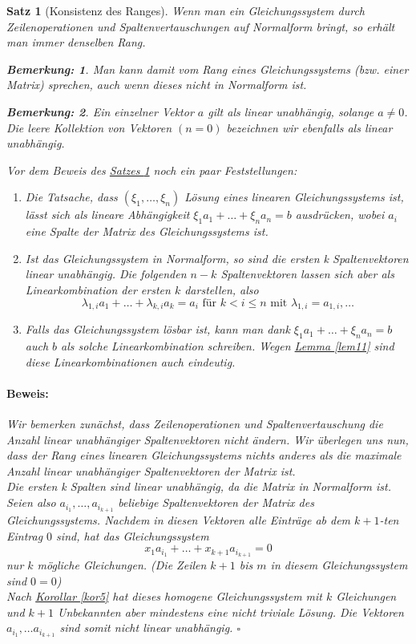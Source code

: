 \documentclass{report}
\newcommand{\lb}{\lambda}
\theoremstyle{customrem}
\newtheorem*{bem}{Bemerkung:}
\theoremstyle{customdef}
\newtheorem{satz}[definition]{Satz}
\renewenvironment{proof}{\vspace{-.75cm}\paragraph{Beweis: }}{\vspace{-.5cm}\hfill$\square$}
\begin{document}
	\begin{satz}[Konsistenz des Ranges]
		\label{satz12}
		Wenn man ein Gleichungssystem durch Zeilenoperationen und Spaltenvertauschungen auf Normalform bringt, so erhält man immer denselben Rang.		
		\begin{bem}
			Man kann damit vom Rang eines Gleichungssystems (bzw. einer Matrix) sprechen, auch wenn dieses nicht in Normalform ist.
		\end{bem}
		\begin{bem}
			Ein einzelner Vektor $a$ gilt als linear unabhängig, solange $a \neq 0$. Die leere Kollektion von Vektoren $(n=0)$ bezeichnen wir ebenfalls als linear unabhängig.
		\end{bem}
		\noindent Vor dem Beweis des \hyperref[satz12]{Satzes \ref{satz12}} noch ein paar Feststellungen:
		\begin{enumerate}
			\item Die Tatsache, dass $(\xi_1, \dots, \xi_n)$ Lösung eines linearen Gleichungssystems ist, lässt sich als lineare Abhängigkeit 
			$\xi_1a_1 + \dots + \xi_n a_n = b$ ausdrücken, wobei $a_i$ eine Spalte der Matrix des Gleichungssystems ist.
			\item Ist das Gleichungssystem in Normalform, so sind die ersten k Spaltenvektoren linear unabhängig. Die folgenden $n-k$ Spaltenvektoren lassen sich aber als Linearkombination der ersten $k$ darstellen, also
			$$
			\lb_{1,i}a_1 + \dots + \lb_{k,i}a_k = a_i \text{ für } k < i \le n
			 \text{ mit }  \lb_{1,i} = a_{1,i}, \dots
			$$
			\item Falls das Gleichungssystem lösbar ist, kann man dank $\xi_1a_1 + \dots + \xi_n a_n = b$ auch $b$ als solche Linearkombination schreiben. Wegen \hyperref[lem11]{Lemma \ref{lem11}} sind diese Linearkombinationen auch eindeutig.
		\end{enumerate}
		\begin{proof}
			Wir bemerken zunächst, dass Zeilenoperationen und Spaltenvertauschung die Anzahl linear unabhängiger Spaltenvektoren nicht ändern.
			Wir überlegen uns nun, dass der Rang eines linearen Gleichungssystems nichts anderes als die maximale Anzahl linear unabhängiger Spaltenvektoren der Matrix ist.\\
			Die ersten k Spalten sind linear unabhängig, da die Matrix in Normalform ist. Seien also $a_{i_1}, \dots, a_{i_{k+1}}$ beliebige Spaltenvektoren der Matrix des Gleichungssystems. Nachdem in diesen Vektoren alle Einträge ab dem $k+1$-ten Eintrag $0$ sind, hat das Gleichungssystem \\
			$$
			x_1a_{i_1} + \dots + x_{k+1}a_{i_{k+1}} = 0
			$$
			nur $k$ mögliche Gleichungen. (Die Zeilen $k+1$ bis $m$ in diesem Gleichungssystem sind $0=0$)\\
			Nach \hyperref[kor5]{Korollar \ref{kor5}} hat dieses homogene Gleichungssystem mit $k$ Gleichungen und $k+1$ Unbekannten aber mindestens eine nicht triviale Lösung. Die Vektoren $a_{i_1}, \dots a_{i_{k+1}}$ sind somit nicht linear unabhängig.
		\end{proof}
	\end{satz}
\end{document}
